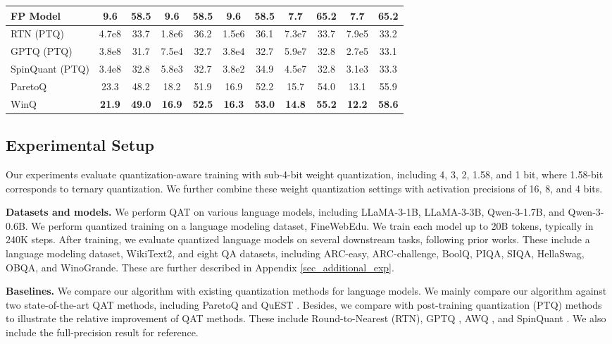 \documentclass{article}
\theoremstyle{definition}
\newcommand{\acronym}{{\sc WinQ}}
\begin{document}
\begin{table}[t!]
{\begin{tabular}{lcc|cc|cc|cc|cc}
    FP Model & {9.6} & {58.5} & {9.6} & {58.5} & {9.6} & {58.5} & \multicolumn{1}{||c}{7.7} & 65.2  & 7.7 & 65.2 \\ \midrule
    RTN (PTQ) &  4.7e8 & 33.7 & 1.8e6 & 36.2 & 1.5e6   & 36.1 & \multicolumn{1}{||c}{7.3e7}  & 33.7  & 7.9e5 & 33.2 \\
    GPTQ (PTQ) & 3.8e8 & 31.7 & 7.5e4  & 32.7  & 3.8e4  & 32.7 & \multicolumn{1}{||c}{5.9e7}  & 32.8 & 2.7e5 & 33.1 \\
    SpinQuant (PTQ) & 3.4e8 & 32.8 & 5.8e3 & 32.7 &  3.8e2   & 34.9 & \multicolumn{1}{||c}{4.5e7} & 32.8 & 3.1e3  & 33.3 \\ 
    ParetoQ & 23.3  & 48.2  & 18.2 & 51.9 & 16.9 & 52.2 & \multicolumn{1}{||c}{15.7} & 54.0 & 13.1 & 55.9 \\ \midrule
    \acronym{} & \textbf{21.9} & \textbf{49.0} & \textbf{16.9} & \textbf{52.5} & \textbf{16.3} & \textbf{53.0} & \multicolumn{1}{||c}{\textbf{14.8}} & \textbf{55.2} & \textbf{12.2}  & \textbf{58.6} \\ 
    \bottomrule
  \end{tabular}
  }
\end{table}


\subsection{Experimental Setup}

Our experiments evaluate quantization-aware training with sub-4-bit weight quantization, including 4, 3, 2, 1.58, and 1 bit, where 1.58-bit corresponds to ternary quantization. We further combine these weight quantization settings with activation precisions of 16, 8, and 4 bits.
 
\textbf{Datasets and models.} We perform QAT on various language models, including LLaMA-3-1B, LLaMA-3-3B, Qwen-3-1.7B, and Qwen-3-0.6B. We perform quantized training on a language modeling dataset, FineWebEdu. We train each model up to 20B tokens, typically in 240K steps.
After training, we evaluate quantized language models on several downstream tasks, following prior works. These include a language modeling dataset, WikiText2, and eight QA datasets, including ARC-easy, ARC-challenge, BoolQ, PIQA, SIQA, HellaSwag, OBQA, and WinoGrande. These are further described in Appendix \ref{sec_additional_exp}. 

\textbf{Baselines.} We compare our algorithm with existing quantization methods for language models. 
We mainly compare our algorithm against two state-of-the-art QAT methods, including ParetoQ \citep{liu2025paretoq} and QuEST \citep{panferov2025quest}. Besides, we compare with post-training quantization (PTQ) methods to illustrate the relative improvement of QAT methods. These include Round-to-Nearest (RTN), GPTQ \citep{frantar2023gptq}, AWQ \citep{lin2024awq}, and SpinQuant \citep{liu2025spinquant}. We also include the full-precision result for reference. 
\end{document}
